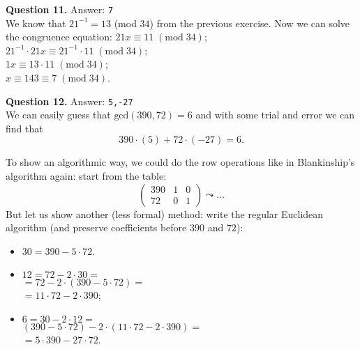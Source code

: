 \documentclass[jou]{apa6}
\begin{document}
\vspace{6pt}
{\bf Question 11.} Answer: {\tt 7}\\
We know that $21^{-1} = 13$ (mod $34$) from the 
previous exercise. Now we can solve the 
congruence equation: 
$21x \equiv 11\;(\text{mod}\;34)$;\\
$21^{-1} \cdot 21x \equiv 21^{-1} \cdot 11\;(\text{mod}\;34)$;\\
$1x \equiv 13 \cdot 11\;(\text{mod}\;34)$;\\
$x \equiv 143 \equiv 7\;(\text{mod}\;34)$.

\vspace{6pt}
{\bf Question 12.} Answer: {\tt 5,-27}\\
We can easily guess that $\text{gcd}(390,72)=6$ and
with some trial and error we can find that
$$390 \cdot (5) + 72\cdot (-27) = 6.$$

To show an algorithmic way, 
we could do the row operations like in Blankinship's algorithm again: 
start from the table:
$$\left( \begin{array}{ccc}
390 & 1 & 0 \\
72 & 0 & 1 \end{array} \right) 
\leadsto \ldots$$
But let us show another (less formal) method: write
the regular Euclidean algorithm (and preserve 
coefficients before $390$ and $72$):
\begin{itemize}
\item $30 = 390 - 5 \cdot 72$.
\item $12 = 72 - 2 \cdot 30 = $\\
$= 72 - 2 \cdot (390 - 5 \cdot 72) =$\\
$= 11 \cdot 72 - 2 \cdot 390$;
\item $6 = 30 - 2 \cdot 12 = $\\
$(390 - 5 \cdot 72) - 2 \cdot (11 \cdot 72 - 2 \cdot 390) =$\\
$=5 \cdot 390 -27 \cdot 72$.
\end{itemize}
\end{document}
